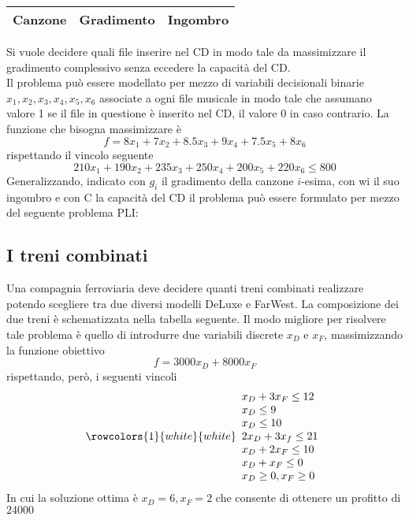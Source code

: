 \documentclass[a4paper]{extarticle}
\renewcommand\arraystretch{}
\begin{document}
\begin{table}[H]
\setlength{\tabcolsep}{8pt}
\renewcommand{\arraystretch}{1.5}
\noindent
\centering
\begin{tabular}{l|cc}
    Canzone & Gradimento & Ingombro\\
    \hline
    
\end{tabular}
\end{table}

\vspace{1em}
\noindent
Si vuole decidere quali file inserire nel CD in modo tale da massimizzare il gradimento complessivo senza eccedere la capacità del CD.\\
Il problema può essere modellato per mezzo di variabili decisionali binarie $x_1,x_2,x_3,x_4,x_5,x_6$ associate a ogni file musicale in modo tale che assumano valore 1 se il file in questione è inserito nel CD, il valore 0 in caso contrario. La funzione che bisogna massimizzare è
\[f = 8 x_1 + 7 x_2 + 8.5 x_3 + 9 x_4 + 7.5 x_5 + 8 x_6\]
rispettando il vincolo seguente
\[210 x_1 + 190 x_2 + 235 x_3 + 250 x_4 + 200 x_5 + 220 x_6 \leq 800\]
Generalizzando, indicato con $g_i$ il gradimento della canzone $i$-esima, con wi il suo ingombro e con C la capacità del CD il problema può essere formulato per mezzo del seguente problema PLI:

\vspace{1em}
\noindent
\subsection{I treni combinati}
Una compagnia ferroviaria deve decidere quanti treni combinati realizzare potendo scegliere tra due diversi modelli DeLuxe e FarWest. La composizione dei due treni è schematizzata nella tabella seguente.
Il modo migliore per risolvere tale problema è quello di introdurre due variabili discrete $x_D$ e $x_F$, massimizzando la funzione obiettivo
\[f = 3000 x_D + 8000 x_F\]
rispettando, però, i seguenti vincoli
\[\rowcolors{1}{white}{white}
\begin{array}{l}
    x_D + 3x_F \leq 12\\
    x_D \leq 9\\
    x_D \leq 10\\
    2x_D + 3 x_f \leq 21\\
    x_D + 2x_F \leq 10\\
    x_D + x_F \leq 0\\
    x_D \geq 0, x_F \geq 0
\end{array}\]
In cui la soluzione ottima è $x_D=6,x_F=2$ che consente di ottenere un profitto di $24000$
\end{document}
